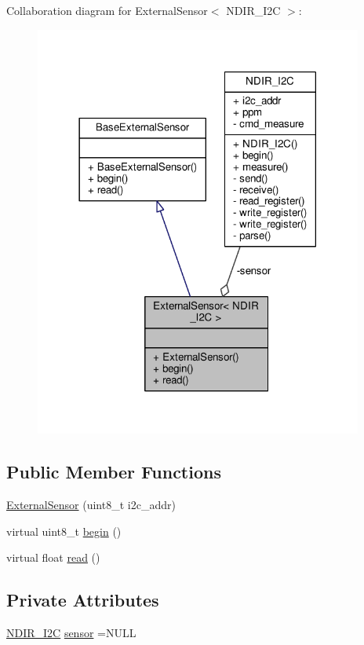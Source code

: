 Collaboration diagram for External\+Sensor$<$ N\+D\+I\+R\+\_\+\+I2C $>$\+:\nopagebreak
\begin{figure}[H]
\begin{center}
\leavevmode
\includegraphics[width=306pt]{d2/d03/class_external_sensor_3_01_n_d_i_r___i2_c_01_4__coll__graph}
\end{center}
\end{figure}
\subsection*{Public Member Functions}
\begin{DoxyCompactItemize}
\item 
\hyperlink{class_external_sensor_3_01_n_d_i_r___i2_c_01_4_aa06970ea689679c0e1deb5360e05a0a4}{External\+Sensor} (uint8\+\_\+t i2c\+\_\+addr)
\item 
virtual uint8\+\_\+t \hyperlink{class_external_sensor_3_01_n_d_i_r___i2_c_01_4_ac6f3614d94968ef0cc11b2b4d69cef03}{begin} ()
\item 
virtual float \hyperlink{class_external_sensor_3_01_n_d_i_r___i2_c_01_4_a239d18652e9fb4673842ae9726edf44f}{read} ()
\end{DoxyCompactItemize}
\subsection*{Private Attributes}
\begin{DoxyCompactItemize}
\item 
\hyperlink{class_n_d_i_r___i2_c}{N\+D\+I\+R\+\_\+\+I2C} \hyperlink{class_external_sensor_3_01_n_d_i_r___i2_c_01_4_ae541c9cece7c38674b70114cdb74a7dc}{sensor} =N\+U\+LL
\end{DoxyCompactItemize}


